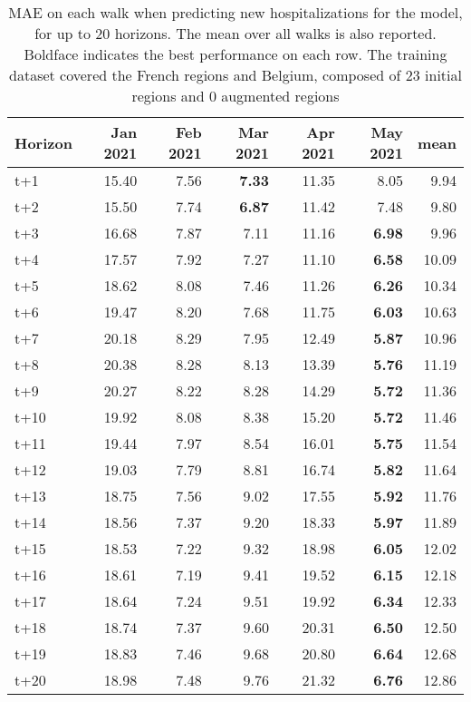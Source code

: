 \begin{table}[H]
\centering
\caption{MAE on each walk when predicting new hospitalizations for the model, for up to 20 horizons. The mean over all walks is also reported. Boldface indicates the best performance on each row. The training dataset covered the French regions and Belgium, composed of 23 initial regions and 0 augmented regions }
\label{tab:MAE_walk_encoder_decoder}
\begin{tabular}{lrrrrrr}
\toprule
Horizon &  Jan 2021 &  Feb 2021 &  Mar 2021 &  Apr 2021 &  May 2021 &  mean \\
\midrule
t+1  & 15.40  & 7.56  & \textbf{7.33}  & 11.35  & 8.05  & 9.94  \\
t+2  & 15.50  & 7.74  & \textbf{6.87}  & 11.42  & 7.48  & 9.80  \\
t+3  & 16.68  & 7.87  & 7.11  & 11.16  & \textbf{6.98}  & 9.96  \\
t+4  & 17.57  & 7.92  & 7.27  & 11.10  & \textbf{6.58}  & 10.09  \\
t+5  & 18.62  & 8.08  & 7.46  & 11.26  & \textbf{6.26}  & 10.34  \\
t+6  & 19.47  & 8.20  & 7.68  & 11.75  & \textbf{6.03}  & 10.63  \\
t+7  & 20.18  & 8.29  & 7.95  & 12.49  & \textbf{5.87}  & 10.96  \\
t+8  & 20.38  & 8.28  & 8.13  & 13.39  & \textbf{5.76}  & 11.19  \\
t+9  & 20.27  & 8.22  & 8.28  & 14.29  & \textbf{5.72}  & 11.36  \\
t+10  & 19.92  & 8.08  & 8.38  & 15.20  & \textbf{5.72}  & 11.46  \\
t+11  & 19.44  & 7.97  & 8.54  & 16.01  & \textbf{5.75}  & 11.54  \\
t+12  & 19.03  & 7.79  & 8.81  & 16.74  & \textbf{5.82}  & 11.64  \\
t+13  & 18.75  & 7.56  & 9.02  & 17.55  & \textbf{5.92}  & 11.76  \\
t+14  & 18.56  & 7.37  & 9.20  & 18.33  & \textbf{5.97}  & 11.89  \\
t+15  & 18.53  & 7.22  & 9.32  & 18.98  & \textbf{6.05}  & 12.02  \\
t+16  & 18.61  & 7.19  & 9.41  & 19.52  & \textbf{6.15}  & 12.18  \\
t+17  & 18.64  & 7.24  & 9.51  & 19.92  & \textbf{6.34}  & 12.33  \\
t+18  & 18.74  & 7.37  & 9.60  & 20.31  & \textbf{6.50}  & 12.50  \\
t+19  & 18.83  & 7.46  & 9.68  & 20.80  & \textbf{6.64}  & 12.68  \\
t+20  & 18.98  & 7.48  & 9.76  & 21.32  & \textbf{6.76}  & 12.86  \\

\bottomrule
\end{tabular}
\end{table}
